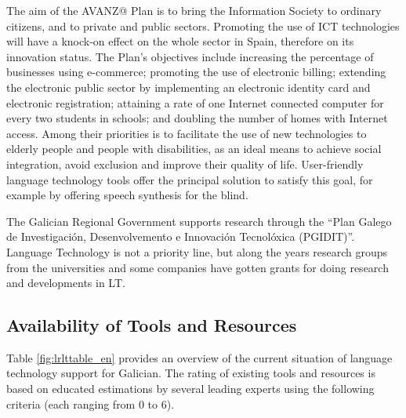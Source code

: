 \begin{multicols}{2}
The aim of the AVANZ@ Plan is to bring the Information Society to ordinary citizens, and to private and public sectors. Promoting the use of ICT technologies will have a knock-on effect on the whole sector in Spain, therefore on its innovation status. The Plan’s objectives include increasing the percentage of businesses using e-commerce; promoting the use of electronic billing; extending the electronic public sector by implementing an electronic identity card and electronic registration; attaining a rate of one Internet connected computer for every two students in schools; and doubling the number of homes with Internet access. Among their priorities is to facilitate the use of new technologies to elderly people and people with disabilities, as an ideal means to achieve social integration, avoid exclusion and improve their quality of life. User-friendly language technology tools offer the principal solution to satisfy this goal, for example by offering speech synthesis for the blind.

The Galician Regional Government supports research through the “Plan Galego de Investigación, Desenvolvemento e Innovación Tecnolóxica (PGIDIT)”. Language Technology is not a priority line, but along the years research groups from the universities and some companies have gotten grants for doing research and developments in LT.
  
\subsection{Availability of Tools and Resources}

Table \ref{fig:lrlttable_en} provides an overview of the current situation of language technology support for Galician. The rating of existing tools and resources is based on educated estimations by several leading experts using the following criteria (each ranging from 0 to 6). 


\end{multicols}
